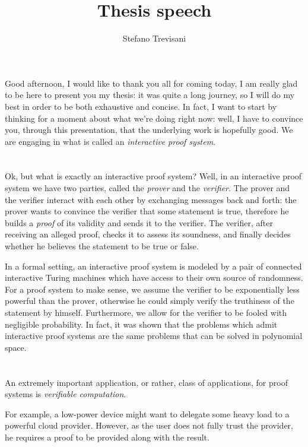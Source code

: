 \documentclass{article}
\author{Stefano Trevisani}
\title{Thesis speech}
\begin{document}
\maketitle

Good afternoon, I would like to thank you all for coming today, I am really glad to be here to 
present you my thesis: it was quite a long journey, so I will do my best in order to be both 
exhaustive and concise.
In fact, I want to start by thinking for a moment about what we're doing right now: well, I have 
to convince you, through this presentation, that the underlying work is hopefully good.
We are engaging in what is called an \emph{interactive proof system}.

\section{}
Ok, but what is exactly an interactive proof system?
Well, in an interactive proof system we have two parties, called the \emph{prover} and the 
\emph{verifier}.
The prover and the verifier interact with each other by exchanging messages back and forth: 
the prover wants to convince the verifier that some statement is true, therefore he builds a 
\emph{proof} of its validity and sends it to the verifier.
The verifier, after receiving an alleged proof, checks it to assess its soundness, and finally 
decides whether he believes the statement to be true or false.

In a formal setting, an interactive proof system is modeled by a pair of connected interactive 
Turing machines which have access to their own source of randomness.
For a proof system to make sense, we assume the verifier to be exponentially less powerful than the 
prover, otherwise he could simply verify the truthiness of the statement by himself.
Furthermore, we allow for the verifier to be fooled with negligible probability.
In fact, it was shown that the problems which admit interactive proof systems are the same problems 
that can be solved in polynomial space. 

\section{}
An extremely important application, or rather, class of applications, for proof systems is 
\emph{verifiable computation}.

For example, a low-power device might want to delegate some heavy load to a powerful cloud provider.
However, as the user does not fully trust the provider, he requires a proof to be provided along 
with the result.
\end{document}
